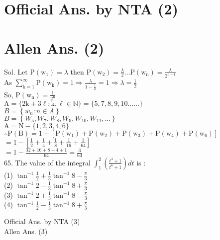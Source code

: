 \documentclass[10pt]{article}
\begin{document}
\section*{Official Ans. by NTA (2)}
\section*{Allen Ans. (2)}
Sol. Let \(\mathrm{P}\left(\mathrm{w}_{1}\right)=\lambda\) then \(\mathrm{P}\left(\mathrm{w}_{2}\right)=\frac{\lambda}{2} \ldots \mathrm{P}\left(\mathrm{w}_{\mathrm{n}}\right)=\frac{\lambda}{2^{\mathrm{n}-1}}\)\\
As \(\sum_{\mathrm{k}=1}^{\infty} \mathrm{P}\left(\mathrm{w}_{\mathrm{k}}\right)=1 \Rightarrow \frac{\lambda}{1-\frac{1}{2}}=1 \Rightarrow \lambda=\frac{1}{2}\)\\
So, \(\mathrm{P}\left(\mathrm{w}_{\mathrm{n}}\right)=\frac{1}{2^{\mathrm{n}}}\)\\
\(\mathrm{A}=\{2 \mathrm{k}+3 \ell ; \mathrm{k}, \ell \in \mathbb{N}\}=\{5,7,8,9,10 \ldots \ldots\}\)\\
\(B=\left\{w_{n}: n \in A\right\}\)\\
\(B=\left\{W_{5}, W_{7}, W_{8}, W_{9}, W_{10}, W_{11}, \ldots\right\}\)\\
\(\mathrm{A}=\mathrm{N}-\{1,2,3,4,6\}\)\\
\(\therefore \mathrm{P}(\mathrm{B})=1-\left[\mathrm{P}\left(\mathrm{w}_{1}\right)+\mathrm{P}\left(\mathrm{w}_{2}\right)+\mathrm{P}\left(\mathrm{w}_{3}\right)+\mathrm{P}\left(\mathrm{w}_{4}\right)+\mathrm{P}\left(\mathrm{w}_{6}\right)\right]\)\\
\(=1-\left[\frac{1}{2}+\frac{1}{4}+\frac{1}{8}+\frac{1}{16}+\frac{1}{64}\right]\)\\
\(=1-\frac{32+16+8+4+1}{64}=\frac{3}{64}\)\\
65. The value of the integral \(\int_{1}^{2}\left(\frac{t^{4}+1}{t^{6}+1}\right) d t\) is :\\
(1) \(\tan ^{-1} \frac{1}{2}+\frac{1}{3} \tan ^{-1} 8-\frac{\pi}{3}\)\\
(2) \(\tan ^{-1} 2-\frac{1}{3} \tan ^{-1} 8+\frac{\pi}{3}\)\\
(3) \(\tan ^{-1} 2+\frac{1}{3} \tan ^{-1} 8-\frac{\pi}{3}\)\\
(4) \(\tan ^{-1} \frac{1}{2}-\frac{1}{3} \tan ^{-1} 8+\frac{\pi}{3}\)

Official Ans. by NTA (3)\\
Allen Ans. (3)
\end{document}
